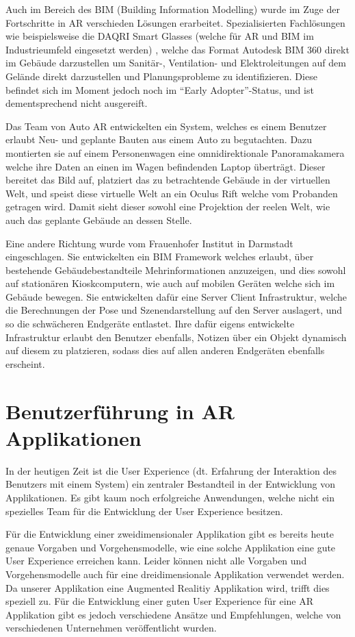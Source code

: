 \documentclass[a4paper]{scrreprt}
\begin{document}
Auch im Bereich des BIM (Building Information Modelling) wurde im Zuge der Fortschritte in AR verschieden Lösungen erarbeitet. Spezialisierten Fachlösungen wie beispielsweise die DAQRI Smart Glasses (welche für AR und BIM im Industrieumfeld eingesetzt werden) \parencite{DAQRI2018}, welche das Format Autodesk BIM 360 direkt im Gebäude darzustellen um Sanitär-, Ventilation- und Elektroleitungen auf dem Gelände direkt darzustellen und Planungsprobleme zu identifizieren. Diese befindet sich im Moment jedoch noch im \textquotedblleft Early Adopter\textquotedblright-Status, und ist dementsprechend nicht ausgereift.

Das Team von Auto AR \parencite{Opperman2015} entwickelten ein System, welches es einem Benutzer erlaubt Neu- und geplante Bauten aus einem Auto zu begutachten. Dazu montierten sie auf einem Personenwagen eine omnidirektionale Panoramakamera welche ihre Daten an einen im Wagen befindenden Laptop überträgt. Dieser bereitet das Bild auf, platziert das zu betrachtende Gebäude in der virtuellen Welt, und speist diese virtuelle Welt an ein Oculus Rift welche vom Probanden getragen wird. Damit sieht dieser sowohl eine Projektion der reelen Welt, wie auch das geplante Gebäude an dessen Stelle.

Eine andere Richtung wurde vom Frauenhofer Institut in Darmstadt \parencite{Olbrich2013} eingeschlagen. Sie entwickelten ein BIM Framework welches erlaubt, über bestehende Gebäudebestandteile Mehrinformationen anzuzeigen, und dies sowohl auf stationären Kioskcomputern, wie auch auf mobilen Geräten welche sich im Gebäude bewegen. Sie entwickelten dafür eine Server Client Infrastruktur, welche die Berechnungen der Pose und Szenendarstellung auf den Server auslagert, und so die schwächeren Endgeräte entlastet. Ihre dafür eigens entwickelte Infrastruktur erlaubt den Benutzer ebenfalls, Notizen über ein Objekt dynamisch auf diesem zu platzieren, sodass dies auf allen anderen Endgeräten ebenfalls erscheint.

\section{Benutzerführung in AR Applikationen}
In der heutigen Zeit ist die User Experience (dt. Erfahrung der Interaktion des Benutzers mit einem System) ein zentraler Bestandteil in der Entwicklung von Applikationen. Es gibt kaum noch erfolgreiche Anwendungen, welche nicht ein spezielles Team für die Entwicklung der User Experience besitzen.

Für die Entwicklung einer zweidimensionaler Applikation gibt es bereits heute genaue Vorgaben und Vorgehensmodelle, wie eine solche Applikation eine gute User Experience erreichen kann. Leider können nicht alle Vorgaben und Vorgehensmodelle auch für eine dreidimensionale Applikation verwendet werden. Da unserer Applikation eine Augmented Realitiy Applikation wird, trifft dies speziell zu.
Für die Entwicklung einer guten User Experience für eine AR Applikation gibt es jedoch verschiedene Ansätze und Empfehlungen, welche von verschiedenen Unternehmen veröffentlicht wurden. 
\end{document}
